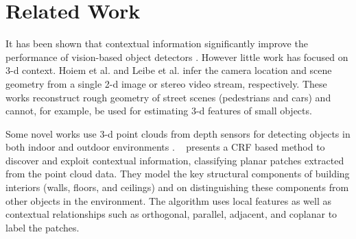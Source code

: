 \documentclass[11pt]{article} %
\begin{document}
\begin{comment}
   \subsection{Method}
     The image is first segmented into smaller point clouds based on segmentation using both image and point cloud features. We define a
     MRF structure, where each segment forms a node in the graph and each segment is connected to its k-nearest neighbours via relation links.
     The various relations we define between objects are: orthogonal, parallel, adjacent, coplanar, self/same-object, above, below, on-top-of, 
     in-front-of, beside, in-proximity, etc. The node potentials will depend on local visual and shape features, and the edge potentials will depend 
     on the contextual relations between the two nodes.

      
   \subsection{Evaluation}
     We evaluate our scene understanding method by measuring the accuracy of semantic labeling on the test set ie., percent of objects labelled 
     correctly. The test sets will comprise of different types of office spaces: 1. new office spaces which weren't used in the training of the model, 
     2. similar office spaces but new rooms, and 
     3. same office spaces but data collected on a different day. 
     
 \end{comment}
     
     
 \section{Related Work}
 
 
    It has been shown that contextual information significantly improve the performance of vision-based 
   object detectors \cite{Torralba:exploting_context, Hoiem:puttingobjects,Torralba:contextualmodels}. However 
   little work has focused on 3-d context. Hoiem et al. \cite{Hoiem:puttingobjects} and Leibe et al. \cite{Leibe07:dynamic} 
  infer the camera location and scene geometry from a single 2-d image or stereo video stream, respectively. 
  These works reconstruct rough geometry of street scenes (pedestrians and cars) and cannot, for example, 
  be used for estimating 3-d features of small objects.
  
    Some novel works use 3-d point clouds from depth sensors for detecting objects in both indoor and outdoor environments 
    \cite {xiong:indoor,Rusu:ObjectMaps , xiong:3DSceneAnalysis, Golovinskiy:shape-basedrecognition, Shapovalov2010}. 
   ~\cite{xiong:indoor} presents a CRF based method to discover and exploit contextual information, classifying planar patches 
   extracted from the point cloud data. They model the key structural components of building interiors (walls, floors, and ceilings) 
   and on distinguishing these components from other objects in the environment. The algorithm uses local features as well as 
   contextual relationships such as orthogonal, parallel, adjacent, and coplanar to label the patches.
  
\end{document}
